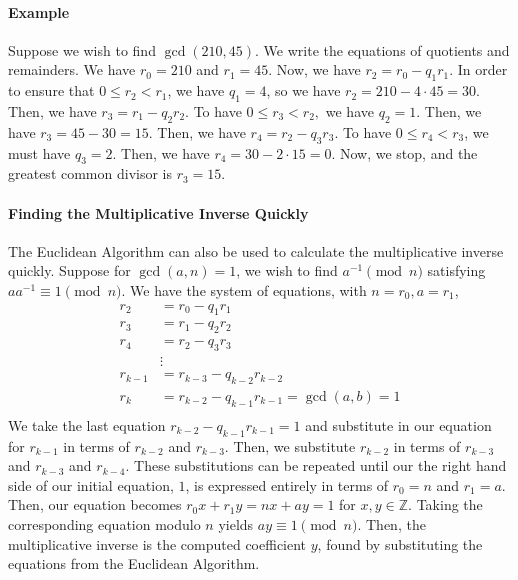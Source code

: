 \documentclass{article}
\newcommand{\Z}{\mathbb{Z}}
\begin{document}
\paragraph{Example} Suppose we wish to find $\gcd(210, 45)$. We write the equations of quotients and remainders. We have $r_0 = 210$ and $r_1 = 45$. Now, we have $r_2 = r_0 - q_1 r_1$. In order to ensure that $0 \le r_2 < r_1$, we have $q_1 = 4$, so we have $r_2 = 210 - 4 \cdot 45 = 30$. Then, we have $r_3 = r_1 - q_2 r_2$. To have $0 \le r_3 < r_2,$ we have $q_2 = 1$. Then, we have $r_3 = 45 - 30 = 15$. Then, we have $r_4 = r_2 - q_3 r_3$. To have $0 \le r_4 < r_3$, we must have $q_3 = 2$. Then, we have $r_4 = 30 - 2 \cdot 15 = 0$. Now, we stop, and the greatest common divisor is $r_3 = 15.$
\paragraph{Finding the Multiplicative Inverse Quickly}
The Euclidean Algorithm can also be used to calculate the multiplicative inverse quickly. Suppose for $\gcd(a, n) = 1$, we wish to find $a^{-1} \pmod n$ satisfying $a a^{-1} \equiv 1 \pmod n$. We have the system of equations, with $n=r_0, a=r_1$,
\begin{align*}
    r_2 &= r_0 - q_1 r_1 \\
    r_3 &= r_1 - q_2 r_2 \\
    r_4 &= r_2 - q_3 r_3 \\
    &\vdots \\
    r_{k-1} &= r_{k-3} - q_{k-2} r_{k-2} \\
    r_k &= r_{k-2} - q_{k-1} r_{k-1} = \gcd(a, b) = 1 \\
\end{align*}
We take the last equation $r_{k-2} - q_{k-1} r_{k-1} = 1$ and substitute in our equation for $r_{k-1}$ in terms of $r_{k-2}$ and $r_{k-3}$. Then, we substitute $r_{k-2}$ in terms of $r_{k-3}$ and $r_{k-3}$ and $r_{k-4}$. These substitutions can be repeated until our the right hand side of our initial equation, $1$, is expressed entirely in terms of $r_0=n$ and $r_1 = a$. Then, our equation becomes $r_0 x + r_1 y = nx + ay = 1$ for $x, y \in \Z$. Taking the corresponding equation modulo $n$ yields $ay \equiv 1 \pmod n$. Then, the multiplicative inverse is the computed coefficient $y$, found by substituting the equations from the Euclidean Algorithm.
\end{document}
